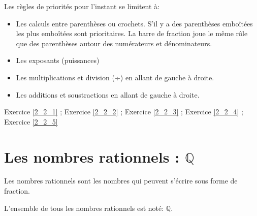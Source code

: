 \begin{prop}{}{}
\noindent Les règles de priorités pour l'instant se limitent à:
\begin{itemize}
\item Les calculs entre parenthèses ou crochets. S'il y a des parenthèses emboîtées les plus emboîtées sont prioritaires. La barre de fraction joue le même rôle que des parenthèses autour des numérateurs et dénominateurs.
\item Les exposants (puissances)
\item Les multiplications et division ($\div$) en allant de gauche à droite.
\item Les additions et soustractions en allant de gauche à droite.
\end{itemize}
\end{prop}	

\begin{exec}
\hspace{0.5cm} \hypertarget{Ex_2_2_1}{} Exercice \ref{2_2_1} \hspace{0.5cm};
\hspace{0.5cm} \hypertarget{Ex_2_2_2}{} Exercice \ref{2_2_2} \hspace{0.5cm};
\hspace{0.5cm} \hypertarget{Ex_2_2_3}{}  Exercice \ref{2_2_3} \hspace{0.5cm};
\hspace{0.5cm} \hypertarget{Ex_2_2_4}{} Exercice \ref{2_2_4} \hspace{0.5cm};
\hspace{0.5cm} \hypertarget{Ex_2_2_5}{}  Exercice \ref{2_2_5} \hspace{0.5cm}
\end{exec}

\vspace{-2mm}
\section{Les nombres rationnels : $\mathbb{Q}$}

\vspace{-2mm}
\begin{defi}{}{}
Les nombres rationnels sont les nombres qui peuvent s'écrire sous forme de fraction. 

\noindent L'ensemble de tous les nombres rationnels est noté: $\mathbb{Q}$.
\end{defi}

